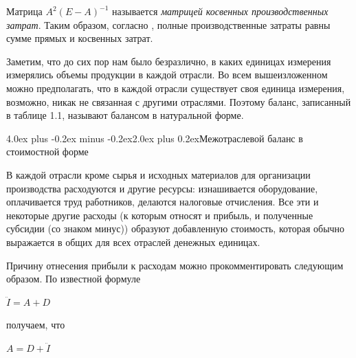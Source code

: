 \documentclass[12pt, 4paper]{book}
\makeatletter
\renewcommand{\section}{\@startsection{section}{1}{1pt}%
	{4.0ex plus -0.2ex minus -0.2ex}{2.0ex plus 0.2ex}{\centering\bf}}%
\makeatother
\begin{document}
{Матрица $A^2(E-A)^{-1}$ называется \textit{матрицей косвенных производственных затрат}. Таким образом, согласно , полные производственные затраты равны сумме прямых и косвенных затрат.
\par

Заметим, что до сих пор нам было безразлично, в каких единицах измерения измерялись объемы продукции в каждой отрасли. Во всем вышеизложенном можно предполагать, что в каждой отрасли существует своя единица измерения, возможно, никак не связанная с другими отраслями. Поэтому баланс, записанный в таблице 1.1, называют балансом в натуральной форме.

\newpage

\section{Межотраслевой баланс в стоимостной форме}
\par

В каждой отрасли кроме сырья и исходных материалов для организации производства расходуются и другие ресурсы: изнашивается оборудование, оплачивается труд работников, делаются налоговые отчисления. Все эти и некоторые другие расходы (к которым относят и прибыль, и полученные субсидии (со знаком минус)) образуют добавленную стоимость, которая обычно выражается в общих для всех отраслей денежных единицах.
\par

Причину отнесения прибыли к расходам можно прокомментировать следующим образом. По известной формуле
\begin{center}
	$\ddot{I} = A + D$
\end{center}
получаем, что
\begin{center}
$A = D + \ddot{I}$
\end{center}
\par

}
\end{document}

